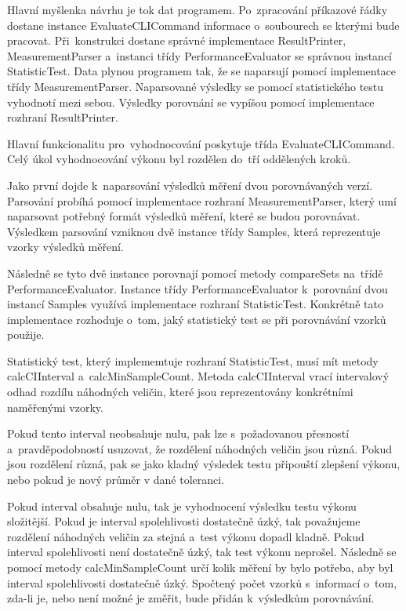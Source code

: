 Hlavní myšlenka návrhu je tok dat programem. Po~zpracování příkazové řádky dostane instance EvaluateCLICommand informace
o~soubourech se kterými bude pracovat. Při~konstrukci dostane správné implementace ResultPrinter,
MeasurementParser a~instanci třídy PerformanceEvaluator se správnou instancí StatisticTest.
Data plynou programem tak, že se naparsují pomocí implementace třídy MeasurementParser. Naparsované výsledky
se pomocí statistického testu vyhodnotí mezi sebou. Výsledky porovnání se vypíšou pomocí implementace rozhraní
ResultPrinter.

Hlavní funkcionalitu pro~vyhodnocování poskytuje třída EvaluateCLICommand. Celý úkol vyhodnocování výkonu
byl rozdělen do~tří oddělených kroků.

Jako první dojde k~naparsování výsledků měření dvou porovnávaných verzí. Parsování probíhá pomocí
implementace rozhraní MeasurementParser, který umí naparsovat potřebný formát výsledků měření, které
se budou porovnávat. Výsledkem parsování vzniknou dvě instance třídy Samples, která reprezentuje vzorky
výsledků měření.

Následně se tyto dvě instance porovnají pomocí metody compareSets na~třídě PerformanceEvaluator. Instance třídy
PerformanceEvaluator k~porovnání dvou instancí Samples využívá implementace rozhraní StatisticTest. Konkrétně
tato implementace rozhoduje o~tom, jaký statistický test se při porovnávání vzorků použije.

Statistický test, který implememtuje rozhraní StatisticTest, musí mít metody calcCIInterval a~calcMinSampleCount.
Metoda calcCIInterval vrací intervalový odhad rozdílu náhodných veličin, které jsou reprezentovány konkrétními
naměřenými vzorky.

Pokud tento interval neobsahuje nulu, pak lze s~požadovanou přesností a~pravděpodobností usuzovat,
že rozdělení náhodných veličin jsou různá. Pokud jsou rozdělení různá, pak se jako kladný výsledek testu připouští
zlepšení výkonu, nebo pokud je nový průměr v dané toleranci.

Pokud interval obsahuje nulu, tak je vyhodnocení výsledku testu výkonu složitější. Pokud je interval spolehlivosti
dostatečně úzký, tak považujeme rozdělení náhodných veličin za stejná a~test výkonu dopadl kladně. Pokud interval
spolehlivosti není dostatečně úzký, tak test výkonu neprošel. Následně se pomocí metody calcMinSampleCount určí
kolik měření by bylo potřeba, aby byl interval spolehlivosti dostatečně úzký. Spočtený počet vzorků s~informací o~tom,
zda-li je, nebo není možné je změřit, bude přidán k~výsledkům porovnávání.

